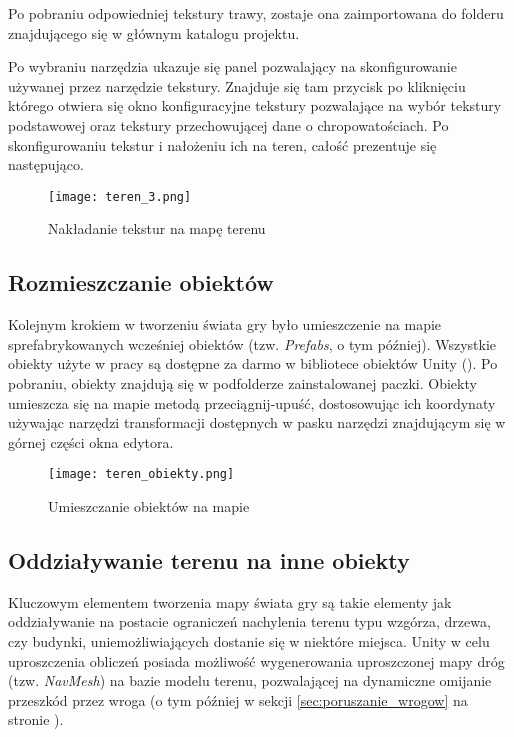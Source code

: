     Po pobraniu odpowiedniej tekstury trawy, zostaje ona zaimportowana do folderu  znajdującego się w głównym katalogu projektu.

    Po wybraniu narzędzia  ukazuje się panel  pozwalający na skonfigurowanie używanej przez narzędzie tekstury. Znajduje się tam przycisk  po kliknięciu którego otwiera się okno konfiguracyjne tekstury pozwalające na wybór tekstury podstawowej oraz tekstury przechowującej dane o chropowatościach. Po skonfigurowaniu tekstur i nałożeniu ich na teren, całość prezentuje się następująco.

    \begin{figure}[H]
    \texttt{[image: teren\_3.png]}
    \caption{Nakładanie tekstur na mapę terenu}
    \end{figure}

\subsection{Rozmieszczanie obiektów}

    Kolejnym krokiem w tworzeniu świata gry było umieszczenie na mapie sprefabrykowanych wcześniej obiektów (tzw. \textit{Prefabs}, o tym później). Wszystkie obiekty użyte w pracy są dostępne za darmo w bibliotece obiektów Unity (). Po pobraniu, obiekty znajdują się w podfolderze  zainstalowanej paczki. Obiekty umieszcza się na mapie metodą przeciągnij-upuść, dostosowując ich koordynaty używając narzędzi transformacji dostępnych w pasku narzędzi znajdującym się w górnej części okna edytora.

    \begin{figure}[H]
    \texttt{[image: teren\_obiekty.png]}
    \caption{Umieszczanie obiektów na mapie}
    \end{figure}


\subsection{Oddziaływanie terenu na inne obiekty}

    Kluczowym elementem tworzenia mapy świata gry są takie elementy jak oddziaływanie na postacie ograniczeń nachylenia terenu typu wzgórza, drzewa, czy budynki, uniemożliwiających dostanie się w niektóre miejsca. Unity w celu uproszczenia obliczeń posiada możliwość wygenerowania uproszczonej mapy dróg (tzw. \textit{NavMesh}) na bazie modelu terenu, pozwalającej na dynamiczne omijanie przeszkód przez wroga (o tym później w sekcji \ref{sec:poruszanie_wrogow} na stronie \pageref{sec:poruszanie_wrogow}).


